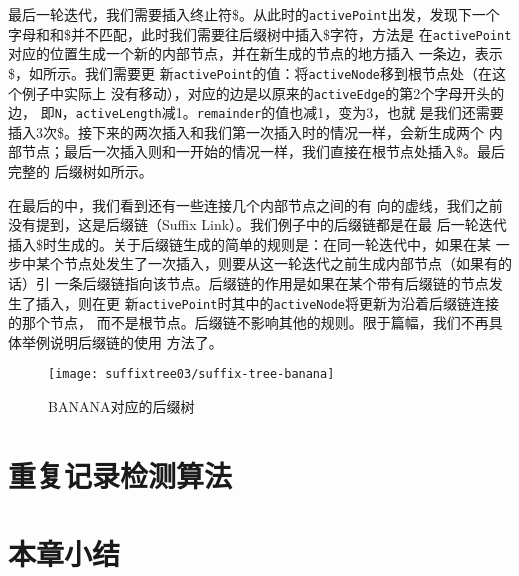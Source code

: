最后一轮迭代，我们需要插入终止符\$。从此时的\texttt{activePoint}出发，发现下一个
字母和和\$并不匹配，此时我们需要往后缀树中插入\$字符，方法是
在\texttt{activePoint}对应的位置生成一个新的内部节点，并在新生成的节点的地方插入
一条边，表示\$，如所示。我们需要更
新\texttt{activePoint}的值：将\texttt{activeNode}移到根节点处（在这个例子中实际上
没有移动），对应的边是以原来的\texttt{activeEdge}的第2个字母开头的边，
即\texttt{N}，\texttt{activeLength}减1。\texttt{remainder}的值也减1，变为3，也就
是我们还需要插入3次\$。接下来的两次插入和我们第一次插入时的情况一样，会新生成两个
内部节点；最后一次插入则和一开始的情况一样，我们直接在根节点处插入\$。最后完整的
后缀树如所示。

在最后的中，我们看到还有一些连接几个内部节点之间的有
向的虚线，我们之前没有提到，这是后缀链（Suffix Link）。我们例子中的后缀链都是在最
后一轮迭代插入\$时生成的。关于后缀链生成的简单的规则是：在同一轮迭代中，如果在某
一步中某个节点处发生了一次插入，则要从这一轮迭代之前生成内部节点（如果有的话）引
一条后缀链指向该节点。后缀链的作用是如果在某个带有后缀链的节点发生了插入，则在更
新\texttt{activePoint}时其中的\texttt{activeNode}将更新为沿着后缀链连接的那个节点，
而不是根节点。后缀链不影响其他的规则。限于篇幅，我们不再具体举例说明后缀链的使用
方法了。
\begin{figure}
  \centering
  \texttt{[image: suffixtree03/suffix-tree-banana]}
  \caption{BANANA对应的后缀树}
  \label{suffixtree:fig:suffix-tree-banana}
\end{figure}

\section{重复记录检测算法}
\label{sec:multipldetect}

\section{本章小结}
\label{sec:summarysuffixtree}


